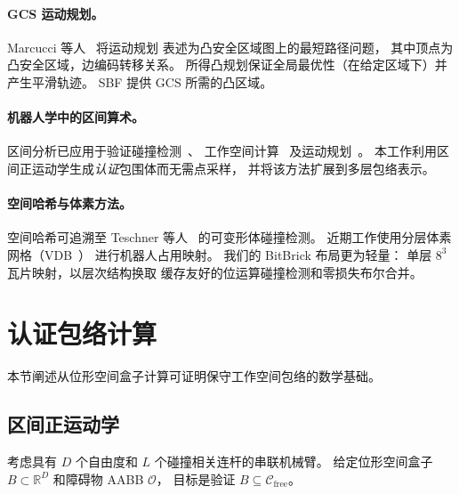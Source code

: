 \documentclass[journal]{IEEEtran}
\newcommand{\Cfree}{\mathcal{C}_\text{free}}
\newcommand{\Real}{\mathbb{R}}
\newcommand{\calO}{\mathcal{O}}
\begin{document}
\paragraph{GCS 运动规划。}
Marcucci 等人~\cite{marcucci2024motion} 将运动规划
表述为凸安全区域图上的最短路径问题，
其中顶点为凸安全区域，边编码转移关系。
所得凸规划保证全局最优性（在给定区域下）并产生平滑轨迹。
SBF 提供 GCS 所需的凸区域。

\paragraph{机器人学中的区间算术。}
区间分析已应用于验证碰撞检测~\cite{merlet2004solving}、
工作空间计算~\cite{merlet2006interval}
及运动规划~\cite{jaulin2001applied}。
本工作利用区间正运动学生成\emph{认证}包围体而无需点采样，
并将该方法扩展到多层包络表示。

\paragraph{空间哈希与体素方法。}
空间哈希可追溯至 Teschner 等人~\cite{teschner2003optimized}
的可变形体碰撞检测。
近期工作使用分层体素网格（VDB~\cite{museth2013vdb}）
进行机器人占用映射。
我们的 BitBrick 布局更为轻量：
单层 $8^3$ 瓦片映射，以层次结构换取
缓存友好的位运算碰撞检测和零损失布尔合并。

\section{认证包络计算}\label{sec:envelope}


本节阐述从位形空间盒子计算可证明保守工作空间包络的数学基础。

\subsection{区间正运动学}\label{sec:ifk}

考虑具有 $D$ 个自由度和 $L$ 个碰撞相关连杆的串联机械臂。
给定位形空间盒子 $B \subset \Real^D$ 和障碍物 AABB $\calO$，
目标是验证 $B \subseteq \Cfree$。
\end{document}
